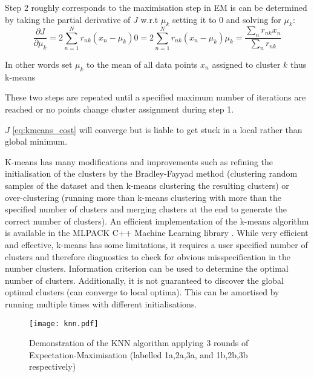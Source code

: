 Step 2 roughly corresponds to the maximisation step in EM is can be determined by taking the partial derivative of \(J\) w.r.t 
\(\mu_{k}\) setting it to 0 and solving for \(\mu_{k}\):
\[
    \frac{\partial J}{\partial \mu_{k}} = 2 \sum_{n=1}^{N} r_{nk} (x_{n} - \mu_{k})
    0 = 2 \sum_{n=1}^{N} r_{nk} (x_{n} - \mu_{k})
    \mu_{k} = \frac{\sum_{n} r_{nk}x_{n}}{\sum_{n} r_{nk}}
\]

In other words set \(\mu_{k}\) to the mean of all data points \(x_{n}\) assigned to cluster \(k\) thus k-means \citep{Bishop2006}

These two steps are repeated until a specified maximum number of iterations are reached or no points change cluster assignment during
step 1.

\(J\) \ref{eq:kmeans_cost} will converge but is liable to get stuck in a local rather than global minimum.

K-means has many modifications and improvements such as refining the initialisation of the clusters by 
the Bradley-Fayyad method (clustering random samples of the dataset and then k-means clustering the resulting clusters) \citep{Bradley1998} 
or over-clustering (running more than k-means clustering with more than the specified number of clusters and merging clusters at the end
to generate the correct number of clusters).
An efficient implementation of the k-means algorithm is available in the MLPACK C++ Machine Learning library \citep{mlpack2013}.
While very efficient and effective, k-means has some limitations, it requires a user specified number of clusters
and therefore diagnostics to check for obvious misspecification in the number clusters.  Information criterion
can be used to determine the optimal number of clusters.
Additionally, it is not guaranteed
to discover the global optimal clusters (can converge to local optima).  This can be amortised by running multiple times 
with different initialisations.


\begin{figure}[h]
    \texttt{[image: knn.pdf]}
    \caption{Demonstration of the KNN algorithm applying 3 rounds of Expectation-Maximisation (labelled
    1a,2a,3a, and 1b,2b,3b respectively) }
    \label{fig:knn}
\end{figure}





